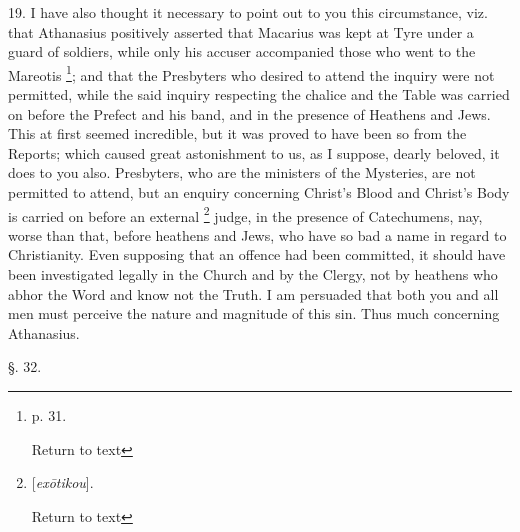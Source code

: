 19. I have also thought it necessary to point out
to you this circumstance, viz. that Athanasius positively asserted
that Macarius was kept at Tyre under a guard of soldiers, while only
his accuser accompanied those who went to the Mareotis \footnote{p. 31.

Return to text}; and that the Presbyters who desired to attend the inquiry
were not permitted, while the said inquiry respecting the chalice and
the Table was carried on before the Prefect and his band, and in the
presence of Heathens and Jews. This at first seemed incredible,
but it was proved to have been so from the Reports; which caused great
astonishment to us, as I suppose, dearly beloved, it does to you also.
Presbyters, who are the ministers of the Mysteries, are not permitted
to attend, but an enquiry concerning Christ's Blood and Christ's Body
is carried on before an external \footnote{[\emph{ex\={o}tikou}].

Return to text} judge, in the presence of Catechumens, nay, worse than that,
before heathens and Jews, who have so bad a name in regard to
Christianity. Even supposing that an offence had been committed, it
should have been investigated legally in the Church and by the Clergy,
not by heathens who abhor the Word and know not the Truth. I am
persuaded that both you and all men must perceive the nature and
magnitude of this sin. Thus much concerning Athanasius.

§. 32.

